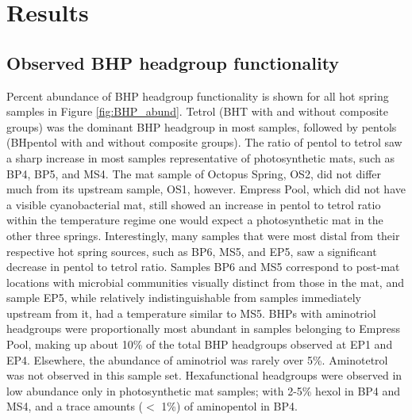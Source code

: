 \section{Results}

\subsection{Observed BHP headgroup functionality}


Percent abundance of BHP headgroup functionality is shown for all hot spring samples in Figure \ref{fig:BHP_abund}. Tetrol (BHT with and without composite groups) was the dominant BHP headgroup in most samples, followed by pentols (BHpentol with and without composite groups). The ratio of pentol to tetrol saw a sharp increase in most samples representative of photosynthetic mats, such as BP4, BP5, and MS4. The mat sample of Octopus Spring, OS2, did not differ much from its upstream sample, OS1, however. Empress Pool, which did not have a visible cyanobacterial mat, still showed an increase in pentol to tetrol ratio within the temperature regime one would expect a photosynthetic mat in the other three springs. Interestingly, many samples that were most distal from their respective hot spring sources, such as BP6, MS5, and EP5, saw a significant decrease in pentol to tetrol ratio. Samples BP6 and MS5 correspond to post-mat locations with microbial communities visually distinct from those in the mat, and sample EP5, while relatively indistinguishable from samples immediately upstream from it, had a temperature similar to MS5. BHPs with aminotriol headgroups were proportionally most abundant in samples belonging to Empress Pool, making up about 10\% of the total BHP headgroups observed at EP1 and EP4. Elsewhere, the abundance of aminotriol was rarely over 5\%. Aminotetrol was not observed in this sample set. Hexafunctional headgroups were observed in low abundance only in photosynthetic mat samples; with 2-5\% hexol in BP4 and MS4, and a trace amounts ($<$ 1\%) of aminopentol in BP4.

